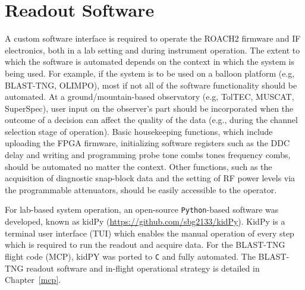\section{Readout Software}\label{software}

A custom software interface is required to operate the ROACH2 firmware and IF electronics, both in a lab setting and during instrument operation. The extent to which the software is automated depends on the context in which the system is being used. For example, if the system is to be used on a balloon platform (e.g, BLAST-TNG, OLIMPO), most if not all of the software functionality should be automated. At a ground/mountain-based observatory (e.g, TolTEC, MUSCAT, SuperSpec), user input on the observer's part should be incorporated when the outcome of a decision can affect the quality of the data (e.g., during the channel selection stage of operation). Basic housekeeping functions, which include uploading the FPGA firmware, initializing software registers such as the DDC delay and writing and programming probe tone combs tones frequency combs, should be automated no matter the context. Other functions, such as the acquisition of diagnostic snap-block data and the setting of RF power levels via the programmable attenuators, should be easily accessible to the operator.

For lab-based system operation, an open-source \texttt{Python}-based software was developed, known as kidPy (\url{https://github.com/sbg2133/kidPy}). KidPy is a terminal user interface (TUI) which enables the manual operation of every step which is required to run the readout and acquire data. For the BLAST-TNG flight code (MCP), kidPY was ported to \texttt{C} and fully automated. The BLAST-TNG readout software and in-flight operational strategy is detailed in Chapter~\ref{mcp}.
